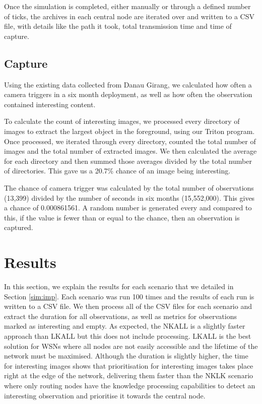 	Once the simulation is completed, either manually or through a defined number of ticks, the archives in each central node are iterated over and written to a CSV file, with details like the path it took, total transmission time and time of capture.
	
\subsection{Capture}
	Using the existing data collected from Danau Girang, we calculated how often a camera triggers in a six month deployment, as well as how often the observation contained interesting content. 
	
	To calculate the count of interesting images, we processed every directory of images to extract the largest object in the foreground, using our Triton program. Once processed, we iterated through every directory, counted the total number of images and the total number of extracted images. We then calculated the average for each directory and then summed those averages divided by the total number of directories. This gave us a 20.7\% chance of an image being interesting.
	
	The chance of camera trigger was calculated by the total number of observations (13,399) divided by the number of seconds in six months (15,552,000). This gives a chance of 0.000861561. A random number is generated every and compared to this, if the value is fewer than or equal to the chance, then an observation is captured.

\section{Results}
	In this section, we explain the results for each scenario that we detailed in Section \ref{sim:imp}. Each scenario was run 100 times and the results of each run is written to a CSV file. We then process all of the CSV files for each scenario and extract the duration for all observations, as well as metrics for observations marked as interesting and empty. As expected, the NKALL is a slightly faster approach than LKALL but this does not include processing. LKALL is the best solution for WSNs where all nodes are not easily accessible and the lifetime of the network must be maximised.  Although the duration is slightly higher, the time for interesting images shows that prioritisation for interesting images takes place right at the edge of the network, delivering them faster than the NKLK scenario where only routing nodes have the knowledge processing capabilities to detect an interesting observation and prioritise it towards the central node.
	
